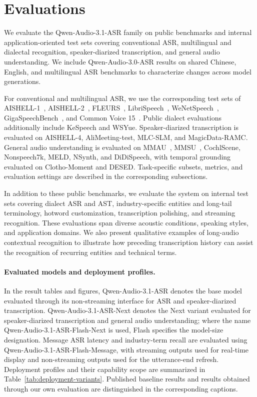 \documentclass{article}
\begin{document}
\section{Evaluations}
\label{sec:exp}

We evaluate the Qwen-Audio-3.1-ASR family on public benchmarks and internal application-oriented test sets covering conventional ASR, multilingual and dialectal recognition, speaker-diarized transcription, and general audio understanding. We include Qwen-Audio-3.0-ASR results on shared Chinese, English, and multilingual ASR benchmarks to characterize changes across model generations.

For conventional and multilingual ASR, we use the corresponding test sets of AISHELL-1~\citep{bu2017aishell1opensourcemandarinspeech}, AISHELL-2~\citep{du2018aishell2transformingmandarinasr}, FLEURS~\citep{conneau2022fleursfewshotlearningevaluation}, LibriSpeech~\citep{7178964}, WeNetSpeech~\citep{zhang2022wenetspeech10000hoursmultidomain}, GigaSpeechBench~\citep{tu2026gigaspeechbench}, and Common Voice 15~\citep{ardila2020commonvoice}. Public dialect evaluations additionally include KeSpeech and WSYue. Speaker-diarized transcription is evaluated on AISHELL-4, AliMeeting-test, MLC-SLM, and MagicData-RAMC. General audio understanding is evaluated on MMAU~\citep{q31_sakshi2024mmau}, MMSU~\citep{q31_wang2025mmsu}, CochlScene, Nonspeech7k, MELD, NSynth, and DiDiSpeech, with temporal grounding evaluated on Clotho-Moment and DESED. Task-specific subsets, metrics, and evaluation settings are described in the corresponding subsections.

%
%

In addition to these public benchmarks, we evaluate the system on internal test sets covering dialect ASR and AST, industry-specific entities and long-tail terminology, hotword customization, transcription polishing, and streaming recognition. These evaluations span diverse acoustic conditions, speaking styles, and application domains. We also present qualitative examples of long-audio contextual recognition to illustrate how preceding transcription history can assist the recognition of recurring entities and technical terms.

\paragraph{Evaluated models and deployment profiles.}
In the result tables and figures, Qwen-Audio-3.1-ASR denotes the base model evaluated through its non-streaming interface for ASR and speaker-diarized transcription. Qwen-Audio-3.1-ASR-Next denotes the Next variant evaluated for speaker-diarized transcription and general audio understanding; where the name Qwen-Audio-3.1-ASR-Flash-Next is used, Flash specifies the model-size designation. Message ASR latency and industry-term recall are evaluated using Qwen-Audio-3.1-ASR-Flash-Message, with streaming outputs used for real-time display and non-streaming outputs used for the utterance-end refresh. Deployment profiles and their capability scope are summarized in Table~\ref{tab:deployment-variants}. Published baseline results and results obtained through our own evaluation are distinguished in the corresponding captions.
\end{document}
